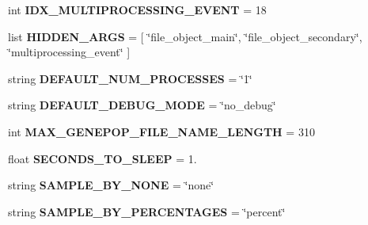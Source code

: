 \begin{DoxyCompactItemize}
\item 
int {\bfseries I\+D\+X\+\_\+\+M\+U\+L\+T\+I\+P\+R\+O\+C\+E\+S\+S\+I\+N\+G\+\_\+\+E\+V\+E\+NT} = 18\hypertarget{namespacenegui_1_1pgdriveneestimator_a427f95ec852875c946e3f84471765f5a}{}\label{namespacenegui_1_1pgdriveneestimator_a427f95ec852875c946e3f84471765f5a}

\item 
list {\bfseries H\+I\+D\+D\+E\+N\+\_\+\+A\+R\+GS} = \mbox{[} \char`\"{}file\+\_\+object\+\_\+main\char`\"{}, \char`\"{}file\+\_\+object\+\_\+secondary\char`\"{}, \char`\"{}multiprocessing\+\_\+event\char`\"{} \mbox{]}\hypertarget{namespacenegui_1_1pgdriveneestimator_a6fd954e84a4eb8eeb2a1a63e5f53c716}{}\label{namespacenegui_1_1pgdriveneestimator_a6fd954e84a4eb8eeb2a1a63e5f53c716}

\item 
string {\bfseries D\+E\+F\+A\+U\+L\+T\+\_\+\+N\+U\+M\+\_\+\+P\+R\+O\+C\+E\+S\+S\+ES} = \char`\"{}1\char`\"{}\hypertarget{namespacenegui_1_1pgdriveneestimator_a2e948c0ce60271c8e6e3b08edb453839}{}\label{namespacenegui_1_1pgdriveneestimator_a2e948c0ce60271c8e6e3b08edb453839}

\item 
string {\bfseries D\+E\+F\+A\+U\+L\+T\+\_\+\+D\+E\+B\+U\+G\+\_\+\+M\+O\+DE} = \char`\"{}no\+\_\+debug\char`\"{}\hypertarget{namespacenegui_1_1pgdriveneestimator_af83e46ff34683de5b4e27783ac68425f}{}\label{namespacenegui_1_1pgdriveneestimator_af83e46ff34683de5b4e27783ac68425f}

\item 
int {\bfseries M\+A\+X\+\_\+\+G\+E\+N\+E\+P\+O\+P\+\_\+\+F\+I\+L\+E\+\_\+\+N\+A\+M\+E\+\_\+\+L\+E\+N\+G\+TH} = 310\hypertarget{namespacenegui_1_1pgdriveneestimator_aaaca09e92573315d60360d27b83338ee}{}\label{namespacenegui_1_1pgdriveneestimator_aaaca09e92573315d60360d27b83338ee}

\item 
float {\bfseries S\+E\+C\+O\+N\+D\+S\+\_\+\+T\+O\+\_\+\+S\+L\+E\+EP} = 1.\hypertarget{namespacenegui_1_1pgdriveneestimator_a1363a44c877cd0837fd1f4eae1f2d6e9}{}\label{namespacenegui_1_1pgdriveneestimator_a1363a44c877cd0837fd1f4eae1f2d6e9}

\item 
string {\bfseries S\+A\+M\+P\+L\+E\+\_\+\+B\+Y\+\_\+\+N\+O\+NE} = \char`\"{}none\char`\"{}\hypertarget{namespacenegui_1_1pgdriveneestimator_a246310ae93ed3bccc2b7d6a21bcfd917}{}\label{namespacenegui_1_1pgdriveneestimator_a246310ae93ed3bccc2b7d6a21bcfd917}

\item 
string {\bfseries S\+A\+M\+P\+L\+E\+\_\+\+B\+Y\+\_\+\+P\+E\+R\+C\+E\+N\+T\+A\+G\+ES} = \char`\"{}percent\char`\"{}\hypertarget{namespacenegui_1_1pgdriveneestimator_a6ee69b369b673a4e1a4bd9538dd98416}{}\label{namespacenegui_1_1pgdriveneestimator_a6ee69b369b673a4e1a4bd9538dd98416}


\end{DoxyCompactItemize}
